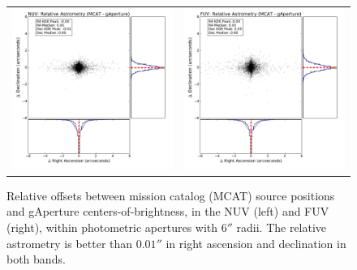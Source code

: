 \documentclass[preprint]{aastex}
\begin{document}
\begin{figure}[h]
\begin{tabular}{cc}
\includegraphics[scale=0.4]{Fig02a.pdf}&
\includegraphics[scale=0.4]{Fig02b.pdf}\\
\end{tabular}
\caption{Relative offsets between mission catalog (MCAT) source positions and gAperture centers-of-brightness, in the NUV (left) and FUV (right), within photometric apertures with $6''$ radii. The relative astrometry is better than $0.01''$ in right ascension and declination in both bands.
\label{astrometry}}
\end{figure}
\end{document}
